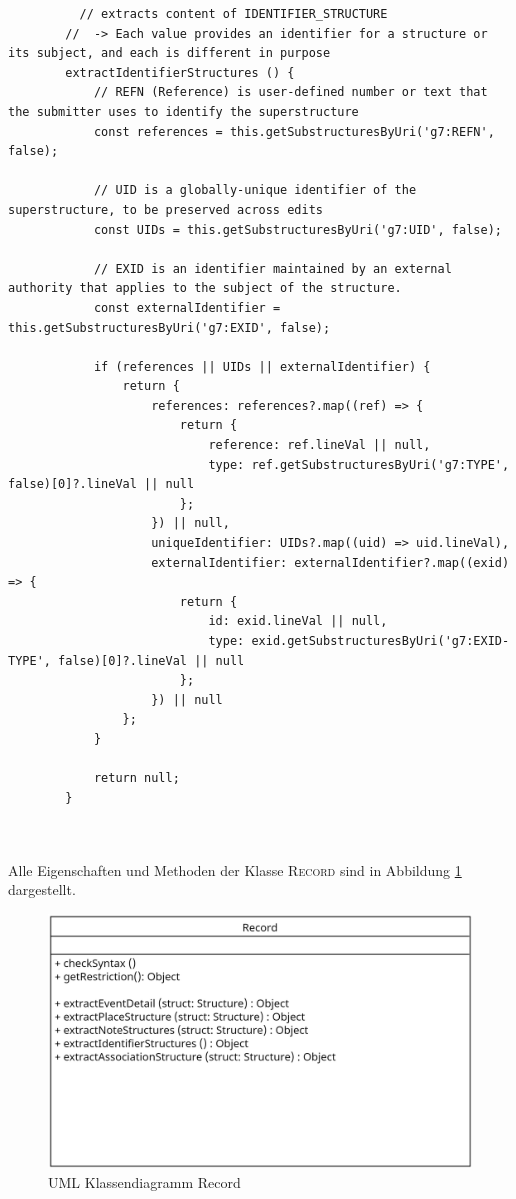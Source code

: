 \begin{minipage}{1.0\textwidth} \small
	\begin{lstlisting}
		  // extracts content of IDENTIFIER_STRUCTURE
		//  -> Each value provides an identifier for a structure or its subject, and each is different in purpose
		extractIdentifierStructures () {
			// REFN (Reference) is user-defined number or text that the submitter uses to identify the superstructure
			const references = this.getSubstructuresByUri('g7:REFN', false);
			
			// UID is a globally-unique identifier of the superstructure, to be preserved across edits
			const UIDs = this.getSubstructuresByUri('g7:UID', false);
			
			// EXID is an identifier maintained by an external authority that applies to the subject of the structure.
			const externalIdentifier = this.getSubstructuresByUri('g7:EXID', false);
			
			if (references || UIDs || externalIdentifier) {
				return {
					references: references?.map((ref) => {
						return {
							reference: ref.lineVal || null,
							type: ref.getSubstructuresByUri('g7:TYPE', false)[0]?.lineVal || null
						};
					}) || null,
					uniqueIdentifier: UIDs?.map((uid) => uid.lineVal),
					externalIdentifier: externalIdentifier?.map((exid) => {
						return {
							id: exid.lineVal || null,
							type: exid.getSubstructuresByUri('g7:EXID-TYPE', false)[0]?.lineVal || null
						};
					}) || null
				};
			}
			
			return null;
		}
	\end{lstlisting}
	\label{lst: extractIdentifier Funktion}
\end{minipage}
\\ \\

Alle Eigenschaften und Methoden der Klasse \textsc{Record} sind in Abbildung \ref{fig: UML Klassendiagramm Record} dargestellt.
\begin{figure}[h]
	\centering
	\includegraphics[width=1\textwidth]{images/UML_Class_Record.png}
	\caption{UML Klassendiagramm Record}
	\label{fig: UML Klassendiagramm Record}
\end{figure}

